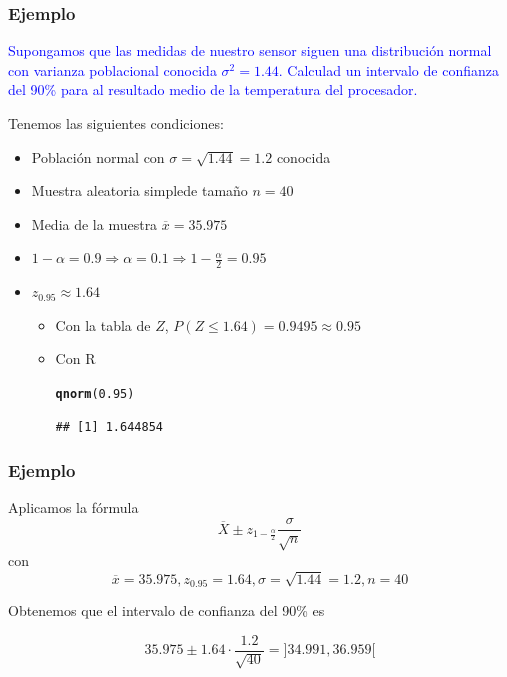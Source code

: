 \documentclass[12pt,t]{beamer}\usepackage[]{graphicx}\usepackage[]{color}
\makeatletter
\newcommand{\hlnum}[1]{\textcolor[rgb]{0.686,0.059,0.569}{#1}}%
\newcommand{\hlstd}[1]{\textcolor[rgb]{0.345,0.345,0.345}{#1}}%
\newcommand{\hlkwd}[1]{\textcolor[rgb]{0.737,0.353,0.396}{\textbf{#1}}}%
\newenvironment{kframe}{%
 \def\at@end@of@kframe{}%
 \ifinner\ifhmode%
  \def\at@end@of@kframe{\end{minipage}}%
  \begin{minipage}{\columnwidth}%
 \fi\fi%
 \def\FrameCommand##1{\hskip\@totalleftmargin \hskip-\fboxsep
 \colorbox{shadecolor}{##1}\hskip-\fboxsep
     \hskip-\linewidth \hskip-\@totalleftmargin \hskip\columnwidth}%
 \MakeFramed {\advance\hsize-\width
   \@totalleftmargin\z@ \linewidth\hsize
   \@setminipage}}%
 {\par\unskip\endMakeFramed%
 \at@end@of@kframe}
\newenvironment{knitrout}{}{} %
\newcommand{\blue}[1]{\textcolor{blue}{#1}}
\renewcommand{\leq}{\leqslant}
\theoremstyle{plain}
\theoremstyle{definition}
\makeatother
\begin{document}
\begin{frame}[fragile]
\frametitle{Ejemplo}
\vspace*{-3ex}

\blue{Supongamos  que las medidas de nuestro sensor siguen  una distribución normal con varianza poblacional conocida $\sigma^2=1.44$. Calculad un intervalo de confianza  del 90\% para al resultado medio de la temperatura del procesador.}
\medskip

Tenemos las siguientes condiciones:
\begin{itemize}
\item Población normal con $\sigma=\sqrt{1.44}=1.2$ conocida
\item Muestra aleatoria simplede  tamaño  $n=40$
\item Media de la muestra  $\overline{x}=35.975$
\item $1-\alpha=0.9\Rightarrow \alpha=0.1\Rightarrow 1-\frac{\alpha}{2}=0.95$
\item $z_{0.95}\approx 1.64$
\begin{itemize}
\item Con la tabla de $Z$, $P(Z\leq 1.64)=0.9495\approx 0.95$
\item Con R
\begin{knitrout}
\color{fgcolor}\begin{kframe}
\begin{alltt}
\hlkwd{qnorm}\hlstd{(}\hlnum{0.95}\hlstd{)}
\end{alltt}
\begin{verbatim}
## [1] 1.644854
\end{verbatim}
\end{kframe}
\end{knitrout}
\end{itemize}
\end{itemize}

\end{frame}


\begin{frame}
\frametitle{Ejemplo}
Aplicamos la fórmula
$$
\overline{X}\pm z_{1-\frac{\alpha}{2}} \frac{\sigma}{\sqrt{n}}
$$
con
$$
\overline{x}=35.975, z_{0.95}=1.64, \sigma=\sqrt{1.44}=1.2, n=40
$$

Obtenemos que el intervalo de confianza  del 90\% es 

$$
35.975\pm 1.64\cdot\frac{1.2}{\sqrt{40}}=
]34.991 , 36.959[
$$

\end{frame}
\end{document}

